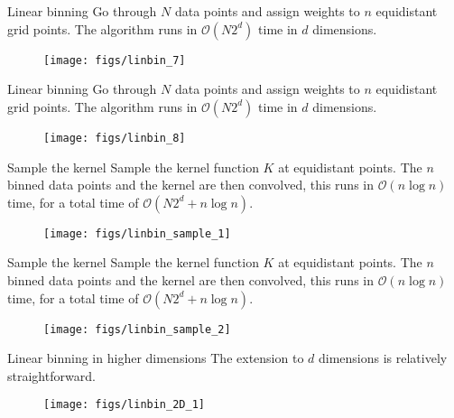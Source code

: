 \documentclass[11pt, aspectratio=149]{beamer}
\theoremstyle{plain}
\begin{document}
\begin{frame}[fragile, t]{Linear binning}
	Go through $N$ data points and assign weights to $n$ equidistant grid points. The algorithm runs in $\mathcal{O}(N2^d)$ time in $d$ dimensions.
	\vfill
	\begin{figure}
		\centering
		\texttt{[image: figs/linbin\_7]}
	\end{figure}
\end{frame}


\begin{frame}[fragile, t]{Linear binning}
	Go through $N$ data points and assign weights to $n$ equidistant grid points. The algorithm runs in $\mathcal{O}(N2^d)$ time in $d$ dimensions.
	\vfill
	\begin{figure}
		\centering
		\texttt{[image: figs/linbin\_8]}
	\end{figure}
\end{frame}


\begin{frame}[fragile, t]{Sample the kernel}
	Sample the kernel function $K$ at equidistant points.
	The $n$ binned data points and the kernel are then convolved, this runs in $\mathcal{O}(n \log n)$ time, for a total time of $\mathcal{O}(N2^d + n \log n)$.
	\vfill
	\begin{figure}
		\centering
		\texttt{[image: figs/linbin\_sample\_1]}
	\end{figure}
\end{frame}

\begin{frame}[fragile, t]{Sample the kernel}
	Sample the kernel function $K$ at equidistant points.
	The $n$ binned data points and the kernel are then convolved, this runs in $\mathcal{O}(n \log n)$ time, for a total time of $\mathcal{O}(N2^d + n \log n)$.
	\vfill
	\begin{figure}
		\centering
		\texttt{[image: figs/linbin\_sample\_2]}
	\end{figure}
\end{frame}



\begin{frame}[fragile, t]{Linear binning in higher dimensions}
	The extension to $d$ dimensions is relatively straightforward.
	\vfill
	\begin{figure}
		\centering
		\texttt{[image: figs/linbin\_2D\_1]}
	\end{figure}
\end{frame}
\end{document}
